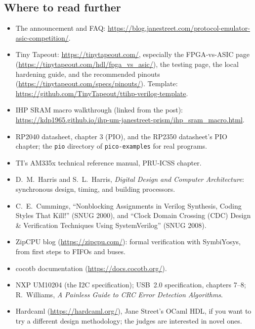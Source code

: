 \subsection{Where to read further}
\begin{itemize}
  \item The announcement and FAQ:\newline
    \url{https://blog.janestreet.com/protocol-emulator-asic-competition/}.
  \item Tiny Tapeout: \url{https://tinytapeout.com/}, especially the
    FPGA-vs-ASIC page (\url{https://tinytapeout.com/hdl/fpga_vs_asic/}), the
    testing page, the local hardening guide, and the recommended pinouts
    (\url{https://tinytapeout.com/specs/pinouts/}). Template:
    \url{https://github.com/TinyTapeout/ttihp-verilog-template}.
  \item IHP SRAM macro walkthrough (linked from the post):
    \url{https://kdp1965.github.io/ihp-um-janestreet-prism/ihp_sram_macro.html}.
  \item RP2040 datasheet, chapter 3 (PIO), and the RP2350 datasheet's PIO
    chapter; the \texttt{pio} directory of \texttt{pico-examples} for real programs.
  \item TI's AM335x technical reference manual, PRU-ICSS chapter.
  \item D.~M.~Harris and S.~L.~Harris, \emph{Digital Design and Computer
    Architecture}: synchronous design, timing, and building processors.
  \item C.~E.~Cummings, ``Nonblocking Assignments in Verilog Synthesis,
    Coding Styles That Kill!'' (SNUG 2000), and ``Clock Domain Crossing
    (CDC) Design \& Verification Techniques Using SystemVerilog'' (SNUG
    2008).
  \item ZipCPU blog (\url{https://zipcpu.com/}): formal verification with
    SymbiYosys, from first steps to FIFOs and buses.
  \item cocotb documentation (\url{https://docs.cocotb.org/}).
  \item NXP UM10204 (the I2C specification); USB~2.0 specification,
    chapters 7--8; R.~Williams, \emph{A Painless Guide to CRC Error
    Detection Algorithms}.
  \item Hardcaml (\url{https://hardcaml.org/}), Jane Street's OCaml HDL, if
    you want to try a different design methodology; the judges are
    interested in novel ones.
\end{itemize}
